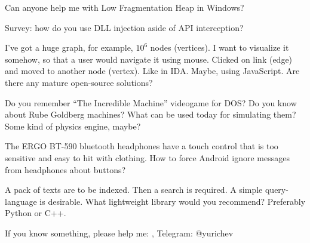 \myhrule{}

Can anyone help me with Low Fragmentation Heap in Windows?

\myhrule{}

Survey: how do you use DLL injection aside of API interception?

\myhrule{}

I've got a huge graph, for example, $10^6$ nodes (vertices).
I want to visualize it somehow, so that a user would navigate it using mouse.
Clicked on link (edge) and moved to another node (vertex).
Like in IDA.
Maybe, using JavaScript.
Are there any mature open-source solutions?

\myhrule{}

Do you remember ``The Incredible Machine'' videogame for DOS?
Do you know about Rube Goldberg machines?
What can be used today for simulating them?
Some kind of physics engine, maybe?

\myhrule{}

The ERGO BT-590 bluetooth headphones have a touch control that is too sensitive and easy to hit with clothing.
How to force Android ignore messages from headphones about buttons?

\myhrule{}

A pack of texts are to be indexed. Then a search is required. A simple query-language is desirable.
What lightweight library would you recommend?
Preferably Python or C++.

\myhrule{}

If you know something, please help me: \EMAIL{}, Telegram: @yurichev


